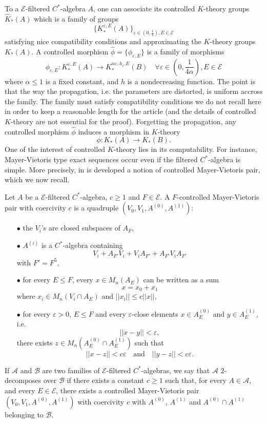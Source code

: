 To a $\mathcal E$-filtered $C^*$-algebra $A$, one can associate its controlled $K$-theory groups $\hat K_*(A)$ which is a family of groups 
\[\{ K^{\varepsilon, E}_*(A) \}_{\varepsilon\in (0, \frac{1}{4}), E\in \mathcal E}\] 
satisfying nice compatibility conditions and approximating the $K$-theory groups $K_*(A)$. A controlled morphism $\hat\phi = \{\phi_{\varepsilon, E}\}$ is a family of morphisms
\[ \phi_{\varepsilon, E} : K^{\varepsilon, E}_*(A) \rightarrow K^{\alpha\varepsilon, h_\varepsilon .E}_*(B) \quad 
\forall \varepsilon \in (0, \frac{1}{4\alpha}), E\in \mathcal E \]
where $\alpha \leq 1$ is a fixed constant, and $h$ is a nondecreasing function. The point is that the way the propagation, i.e. the parameters are distorted, is uniform accross the family. The family must satisfy compatibility conditions we do not recall here in order to keep a reasonable length for the article (and the details of controlled $K$-theory are not essential for the proof). Forgetting the propagation, any controlled morphism $\hat \phi$ induces a morphism in $K$-theory  
\[ \phi : K_*(A) \rightarrow K_*(B) . \]
One of the interest of controlled $K$-theory lies in its computability. For instance, Mayer-Vietoris type exact sequences occur even if the filtered $C^*$-algebra is simple. More precisely, in \cite{OY4} is developed a notion of controlled Mayer-Vietoris pair, which we now recall.

\begin{definition}
Let $A$ be a $\mathcal E$-filtered $C^*$-algebra, $c\geq 1$ and $F\in \mathcal E$. A $F$-controlled Mayer-Vietoris pair with coercivity $c$ is a quadruple $(V_0, V_1, A^{(0)}, A^{(1)})$:
\begin{itemize}
\item[$\bullet$] the $V_i$'s are closed subspaces of $A_F$,
\item[$\bullet$] $A^{(i)}$ is a $C^*$-algebra containing \[ V_i + A_{F'} V_i + V_i A_{F'}  + A_{F'} V_i A_{F'}\]
with $F' = F^5$,
\item[$\bullet$] for every $E\leq F$, every $x\in M_n(A_E)$ can be written as a sum \[x=x_0+x_1\] where $x_i\in M_n(V_i \cap A_E)$ and $|| x_i|| \leq c||x||$,
\item[$\bullet$] for every $\varepsilon>0$, $E\leq F$ and every $\varepsilon$-close elements $x\in A_E^{(0)}$ and $y\in A_E^{(1)}$, i.e.
\[|| x-y || < \varepsilon,\]
there exists $z\in M_n( A_E^{(0)}\cap A_E^{(1)})$ such that \[ ||x-z|| < c\varepsilon \quad \text{and} \quad ||y-z|| < c\varepsilon .\]
\end{itemize}
If $\mathcal A$ and $\mathcal B$ are two families of $\mathcal E$-filtered $C^*$-algebras, we say that $\mathcal A$ $2$-decomposes over $\mathcal B$ if there exists a constant $c\geq 1$ such that, for every $A\in\mathcal A$, and every $E\in \mathcal E$, there exists a controlled Mayer-Vietoris pair $(V_0, V_1, A^{(0)}, A^{(1)})$ with coercivity $c$ with $A^{(0)}$, $A^{(1)}$ and $A^{(0)} \cap A^{(1)}$ belonging to $\mathcal B$.
\end{definition} 

